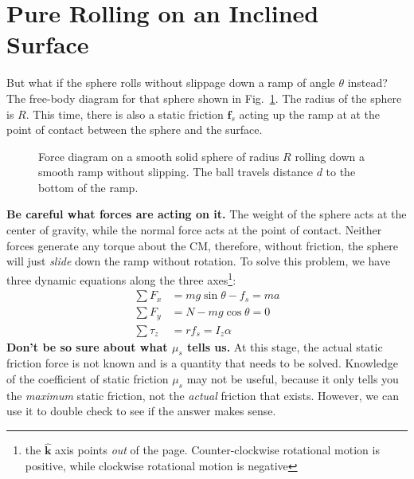 \documentclass{../../../oss-handout}
\newcommand{\mb}[1]{\mathbf{#1}}
\newcommand{\kkk}{\hat{\bm{k}}}
\begin{document}
\section{Pure Rolling on an Inclined Surface}
But what if the sphere rolls without slippage down a ramp of angle $\theta$
instead? The free-body diagram for that sphere shown in Fig.~\ref{roll-ramp}.
The radius of the sphere is $R$. This time, there is also a static friction
$\mb{f}_s$ acting up the ramp at at the point of contact between the sphere and
the surface.
\begin{figure}[!ht]
  \centering
  \caption{Force diagram on a smooth solid sphere of radius $R$ rolling down a
    smooth ramp without slipping. The ball travels distance $d$ to the bottom
    of the ramp.}
  \label{roll-ramp}
\end{figure}

\textbf{Be careful what forces are acting on it.} The weight of the sphere acts
at the center of gravity, while the normal force acts at the point of contact.
Neither forces generate any torque about the CM, therefore, without friction,
the sphere will just \emph{slide} down the ramp without rotation. To solve this
problem, we have three dynamic equations along the three
axes\footnote{the $\kkk$ axis points \emph{out} of the page. Counter-clockwise
  rotational motion is positive, while clockwise rotational motion is negative}:
\begin{align}
  \sum F_x&=mg\sin\theta-f_s=ma\\ \label{f_x}
  \sum F_y&=N-mg\cos\theta=0\\
  \sum\tau_z&=rf_s=I_z\alpha \label{tau}
\end{align}
\textbf{Don't be so sure about what $\mu_s$ tells us.} At this stage, the
actual static friction force is not known and is a quantity that needs to be
solved. Knowledge of the coefficient of static friction $\mu_s$ may not be
useful, because it only tells you the \emph{maximum} static friction, not the
\emph{actual} friction that exists. However, we can use it to double check to
see if the answer makes sense.
\end{document}
